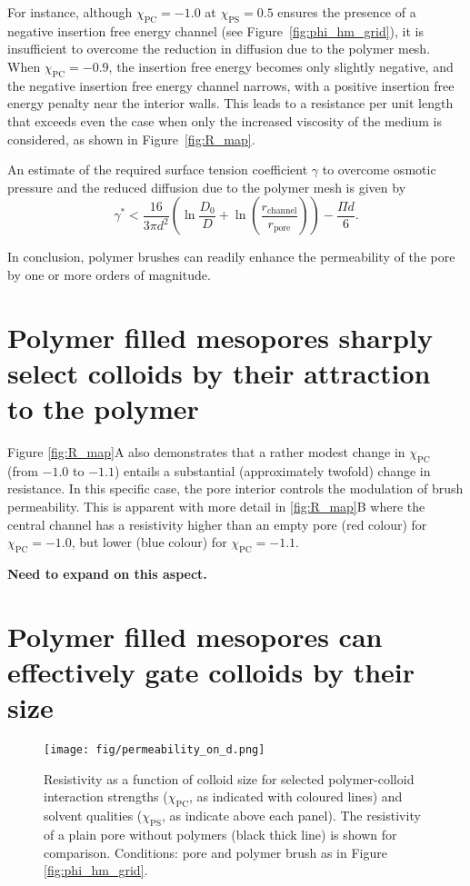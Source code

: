 \documentclass[12pt, a4paper]{article}
\begin{document}
For instance, although $\chi_{\textrm{PC}} = -1.0$ at $\chi_{\textrm{PS}} = 0.5$ ensures the presence of a negative insertion free energy channel (see Figure~\ref{fig:phi_hm_grid}), it is insufficient to overcome the reduction in diffusion due to the polymer mesh. When $\chi_{\textrm{PC}} = -0.9$, the insertion free energy becomes only slightly negative, and the negative insertion free energy channel narrows, with a positive insertion free energy penalty near the interior walls. This leads to a resistance per unit length that exceeds even the case when only the increased viscosity of the medium is considered, as shown in Figure~\ref{fig:R_map}.

An estimate of the required surface tension coefficient $\gamma$ to overcome osmotic pressure and the reduced diffusion due to the polymer mesh is given by
\begin{equation}
\gamma^{\ast} < \frac{16}{3 \pi d^2} \left( \ln\frac{D_0}{D} + \ln\left( \frac{r_{\textrm{channel}}}{r_{\textrm{pore}}} \right) \right) - \frac{\Pi d}{6}.
\end{equation}


In conclusion, polymer brushes can readily enhance the permeability of the pore by one or more orders of magnitude.



\section{Polymer filled mesopores sharply select colloids by their attraction to the polymer}

Figure \ref{fig:R_map}A also demonstrates that a rather modest change in $\chi_{\text{PC}}$ (from $-1.0$ to $-1.1$) entails a substantial (approximately twofold) change in resistance. 
In this specific case, the pore interior controls the modulation of brush permeability. 
This is apparent with more detail in \ref{fig:R_map}B where the central channel has a resistivity higher than an empty pore (red colour) for $\chi_{\text{PC}}=-1.0$, 
but lower (blue colour) for $\chi_{\text{PC}}=-1.1$. 

\textbf{Need to expand on this aspect.}


\section{Polymer filled mesopores can effectively gate colloids by their size}

\begin{figure}
    \centering
    \texttt{[image: fig/permeability\_on\_d.png]}
    \caption{
    Resistivity as a function of colloid size for selected polymer-colloid interaction strengths ($\chi_{\text{PC}}$, as indicated with coloured lines) 
    and solvent qualities ($\chi_{\text{PS}}$, as indicate above each panel). 
    The resistivity of a plain pore without polymers (black thick line) is shown for comparison. 
    Conditions: pore and polymer brush as in Figure \ref{fig:phi_hm_grid}. 
    }
    \label{fig:R_vs_d}
\end{figure}
\end{document}
